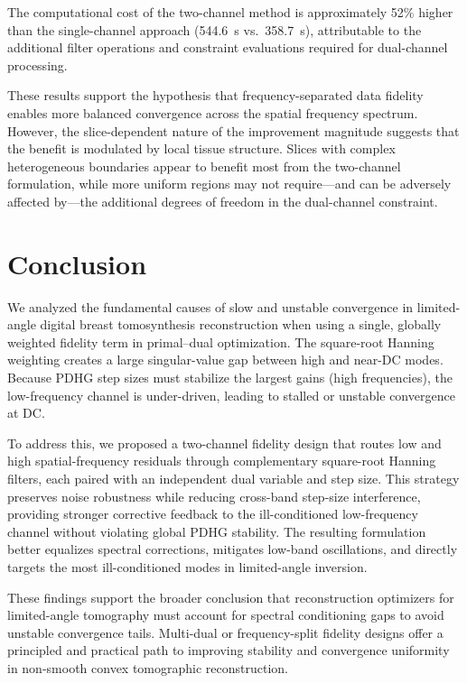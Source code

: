 \documentclass[journal, a4paper]{IEEEtran}
\begin{document}
The computational cost of the two-channel method is approximately 52\% higher than the single-channel approach (544.6~s vs.\ 358.7~s), attributable to the additional filter operations and constraint evaluations required for dual-channel processing.

These results support the hypothesis that frequency-separated data fidelity enables more balanced convergence across the spatial frequency spectrum. However, the slice-dependent nature of the improvement magnitude suggests that the benefit is modulated by local tissue structure. Slices with complex heterogeneous boundaries appear to benefit most from the two-channel formulation, while more uniform regions may not require---and can be adversely affected by---the additional degrees of freedom in the dual-channel constraint.

\section{Conclusion}

We analyzed the fundamental causes of slow and unstable convergence in limited-angle digital breast tomosynthesis reconstruction when using a single, globally weighted fidelity term in primal–dual optimization. The square-root Hanning weighting creates a large singular-value gap between high and near-DC modes. Because PDHG step sizes must stabilize the largest gains (high frequencies), the low-frequency channel is under-driven, leading to stalled or unstable convergence at DC.

To address this, we proposed a two-channel fidelity design that routes low and high spatial-frequency residuals through complementary square-root Hanning filters, each paired with an independent dual variable and step size. This strategy preserves noise robustness while reducing cross-band step-size interference, providing stronger corrective feedback to the ill-conditioned low-frequency channel without violating global PDHG stability. The resulting formulation better equalizes spectral corrections, mitigates low-band oscillations, and directly targets the most ill-conditioned modes in limited-angle inversion.

These findings support the broader conclusion that reconstruction optimizers for limited-angle tomography must account for spectral conditioning gaps to avoid unstable convergence tails. Multi-dual or frequency-split fidelity designs offer a principled and practical path to improving stability and convergence uniformity in non-smooth convex tomographic reconstruction.  
\end{document}
